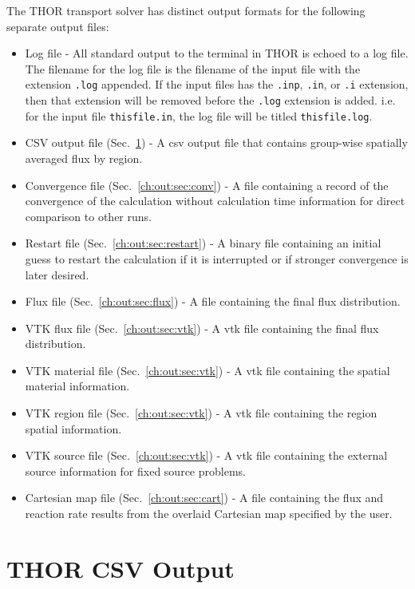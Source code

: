 The THOR transport solver has distinct output formats for the following separate output files:
\begin{itemize}
    \item Log file - All standard output to the terminal in THOR is echoed to a log file.
      The filename for the log file is the filename of the input file with the extension \verb".log" appended.
      If the input files has the \verb".inp", \verb".in", or \verb".i" extension, then that extension will be removed before the \verb".log" extension is added.
      i.e. for the input file \verb"thisfile.in", the log file will be titled \verb"thisfile.log".
    \item CSV output file (Sec.~\ref{ch:out:sec:csv}) - A csv output file that contains group-wise spatially averaged flux by region.
    \item Convergence file (Sec.~\ref{ch:out:sec:conv}) - A file containing a record of the convergence of the calculation without calculation time information for direct comparison to other runs.
    \item Restart file (Sec.~\ref{ch:out:sec:restart}) - A binary file containing an initial guess to restart the calculation if it is interrupted or if stronger convergence is later desired.
    \item Flux file (Sec.~\ref{ch:out:sec:flux}) - A file containing the final flux distribution.
    \item VTK flux file (Sec.~\ref{ch:out:sec:vtk}) - A vtk file containing the final flux distribution.
    \item VTK material file (Sec.~\ref{ch:out:sec:vtk}) - A vtk file containing the spatial material information.
    \item VTK region file (Sec.~\ref{ch:out:sec:vtk}) - A vtk file containing the region spatial information.
    \item VTK source file (Sec.~\ref{ch:out:sec:vtk}) - A vtk file containing the external source information for fixed source problems.
    \item Cartesian map file (Sec.~\ref{ch:out:sec:cart}) - A file containing the flux and reaction rate results from the overlaid Cartesian map specified by the user.
\end{itemize}

\section{THOR CSV Output}\label{ch:out:sec:csv}

